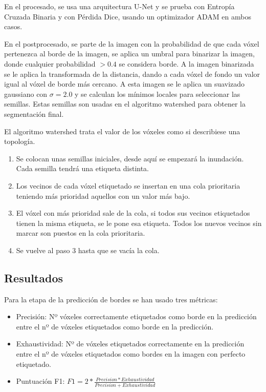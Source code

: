 En el procesado, se usa una arquitectura U-Net y se prueba con Entropía Cruzada Binaria y con Pérdida Dice, usando un optimizador ADAM en ambos casos.

En el postprocesado, se parte de la imagen con la probabilidad de que cada vóxel pertenezca al borde de la imagen, se aplica un umbral para binarizar la imagen, donde cualquier probabilidad $>0.4$ se considera borde. A la imagen binarizada se le aplica la transformada de la distancia, dando a cada vóxel de fondo un valor igual al vóxel de borde más cercano. A esta imagen se le aplica un suavizado gaussiano con $\sigma = 2.0$ y se calculan los mínimos locales para seleccionar las semillas. Estas semillas son usadas en el algoritmo watershed para obtener la segmentación final.

El algoritmo watershed trata el valor de los vóxeles como si describiese una topología.
\begin{enumerate}
\item Se colocan unas semillas iniciales, desde aquí se empezará la inundación. Cada semilla tendrá una etiqueta distinta.
\item Los vecinos de cada vóxel etiquetado se insertan en una cola prioritaria teniendo más prioridad aquellos con un valor más bajo.
\item El vóxel con más prioridad sale de la cola, si todos sus vecinos etiquetados tienen la misma etiqueta, se le pone esa etiqueta. Todos los nuevos vecinos sin marcar son puestos en la cola prioritaria.
\item Se vuelve al paso 3 hasta que se vacía la cola.
\end{enumerate}

\subsection{Resultados}\label{app2_results}


Para la etapa de la predicción de bordes se han usado tres métricas:
\begin{itemize}
\item Precisión: Nº vóxeles correctamente etiquetados como borde en la predicción entre el nº de vóxeles etiquetados como borde en la predicción.
\item Exhaustividad: Nº de vóxeles etiquetados correctamente en la predicción entre el nº de vóxeles etiquetados como bordes en la imagen con perfecto etiquetado.
\item Puntuación F1: $F1=2*\frac{Precision * Exhaustividad}{Precision+Exhaustividad}$
\end{itemize}

